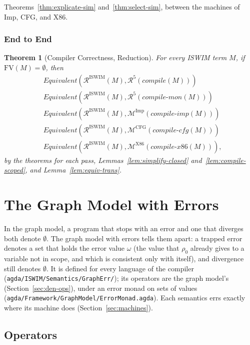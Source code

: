 \documentclass[10pt]{article}
\theoremstyle{acmplain}
\newtheorem{theorem}{Theorem}[section]
\newcommand{\pass}[1]{\mathit{#1}}
\newcommand{\FV}{\mathrm{FV}}
\newcommand{\Mach}[1]{\mathcal{M}^{#1}}
\newcommand{\Equiv}{\mathit{Equivalent}}
\begin{document}
Theorems~\ref{thm:explicate-sim} and~\ref{thm:select-sim}, between the
machines of Imp, CFG, and X86.

\subsubsection{End to End}

\begin{theorem}[Compiler Correctness, Reduction]\label{thm:compiler-red}
For every ISWIM term $M$, if $\FV(M) = \emptyset$, then
\begin{align*}
  &\Equiv(\mathcal{R}^{\mathrm{ISWIM}}(M), \mathcal{R}^{5}(\pass{compile}(M))) \\
  &\Equiv(\mathcal{R}^{\mathrm{ISWIM}}(M), \mathcal{R}^{5}(\pass{compile\text{-}mon}(M))) \\
  &\Equiv(\mathcal{R}^{\mathrm{ISWIM}}(M), \Mach{\mathrm{Imp}}(\pass{compile\text{-}imp}(M))) \\
  &\Equiv(\mathcal{R}^{\mathrm{ISWIM}}(M), \Mach{\mathrm{CFG}}(\pass{compile\text{-}cfg}(M))) \\
  &\Equiv(\mathcal{R}^{\mathrm{ISWIM}}(M), \Mach{\mathrm{X86}}(\pass{compile\text{-}x86}(M))) ,
\end{align*}
by the theorems for each pass, Lemmas~\ref{lem:simplify-closed} and~\ref{lem:compile-scoped}, and
Lemma~\ref{lem:equiv-trans}.
\end{theorem}

\section{The Graph Model with Errors}\label{sec:graph-errors}

In the graph model, a program that stops with an error and one that
diverges both denote $\emptyset$. The graph model with errors tells them
apart: a trapped error denotes a set that holds the error value $\omega$
(the value that $\rho_0$ already gives to a variable not in scope, and
which is consistent only with itself), and divergence still denotes
$\emptyset$. It is defined for every language of the compiler
(\texttt{agda/ISWIM/Semantics/GraphErr/}); its operators are the graph model's
(Section~\ref{sec:den-ops}), under an error monad on sets of values
(\texttt{agda/Framework/GraphModel/ErrorMonad.agda}). Each semantics errs
exactly where its machine does (Section~\ref{sec:machines}).

\subsection{Operators}
\end{document}
